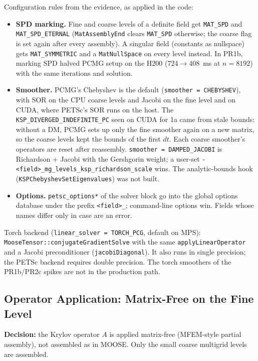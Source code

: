 \documentclass[11pt]{article}
\begin{document}
Configuration rules from the evidence, as applied in the code:
\begin{itemize}[leftmargin=*]
\item \textbf{SPD marking.} Fine and coarse levels of a definite field get
\texttt{MAT\_SPD} and \texttt{MAT\_SPD\_ETERNAL} (\texttt{MatAssemblyEnd}
clears \texttt{MAT\_SPD} otherwise; the coarse flag is set again after every
assembly). A singular field (constants as nullspace) gets
\texttt{MAT\_SYMMETRIC} and a \texttt{MatNullSpace} on every level instead.
In PR1b, marking SPD halved PCMG setup on the H200 (724$\to$408~ms at
$n=8192$) with the same iterations and solution.
\item \textbf{Smoother.} PCMG's Chebyshev is the default
(\texttt{smoother = CHEBYSHEV}), with SOR on the CPU coarse levels and Jacobi on
the fine level and on CUDA, where PETSc's SOR runs on the host. The
\texttt{KSP\_DIVERGED\_INDEFINITE\_PC} seen on CUDA for 1a came from stale bounds:
without a DM, PCMG sets up only the fine smoother again on a new matrix, so the
coarse levels kept the bounds of the first $dt$. Each coarse smoother's operators
are reset after reassembly. \texttt{smoother = DAMPED\_JACOBI} is
Richardson + Jacobi with the Gershgorin weight; a user-set
\texttt{-<field>\_mg\_levels\_ksp\_richardson\_scale} wins. The analytic-bounds
hook (\texttt{KSPChebyshevSetEigenvalues}) was not built.
\item \textbf{Options.} \texttt{petsc\_options*} of the solver block go into
the global options database under the prefix \texttt{<field>\_}; command-line
options win. Fields whose names differ only in case are an error.
\end{itemize}

Torch backend (\texttt{linear\_solver = TORCH\_PCG}, default on MPS):
\texttt{MooseTensor::conjugateGradientSolve} with the same
\texttt{applyLinearOperator} and a Jacobi preconditioner
(\texttt{jacobiDiagonal}). It also runs in single precision; the PETSc
backend requires double precision. The torch smoothers of the PR1b/PR2c spikes are
not in the production path.

\subsection{Operator Application: Matrix-Free on the Fine Level}
\label{sec:partial-assembly}

\begin{tcolorbox}[colback=lightgray, colframe=marlinblue, boxrule=0.6pt, arc=1mm]
\textbf{Decision:} the Krylov operator $A$ is applied matrix-free (MFEM-style
partial assembly), not assembled as in MOOSE. Only the small coarse
multigrid levels are assembled.
\end{tcolorbox}
\end{document}
